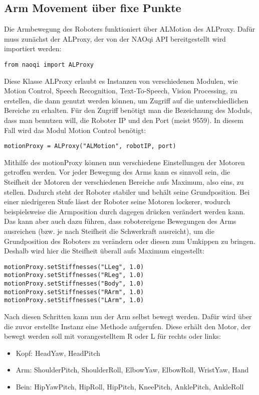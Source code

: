 \subsection{Arm Movement über fixe Punkte}
Die Armbewegung des Roboters funktioniert über ALMotion des ALProxy.
Dafür muss zunächst der ALProxy, der von der NAOqi API bereitgestellt wird importiert werden: 
\begin{verbatim}
from naoqi import ALProxy
\end{verbatim}
Diese Klasse ALProxy erlaubt es Instanzen von verschiedenen Modulen, wie Motion Control, Speech Recognition, Text-To-Speech, Vision Processing, zu erstellen, die dann genutzt werden können, um Zugriff auf die unterschiedlichen Bereiche zu erhalten. Für den Zugriff benötigt man die Bezeichnung des Moduls, dass man benutzen will, die Roboter IP und den Port (meist 9559).
In diesem Fall wird das Modul Motion Control benötigt:
\begin{verbatim}
motionProxy = ALProxy("ALMotion", robotIP, port)
\end{verbatim}
Mithilfe des motionProxy können nun verschiedene Einstellungen der Motoren getroffen werden. Vor jeder Bewegung des Arms kann es sinnvoll sein, die Steifheit der Motoren der verschiedenen Bereiche aufs Maximum, also eins, zu stellen. Dadurch steht der Roboter stabiler und behält seine Grundposition. Bei einer niedrigeren Stufe lässt der Roboter seine Motoren lockerer, wodurch beispielsweise die Armposition durch dagegen drücken verändert werden kann. Das kann aber auch dazu führen, dass robotereigene Bewegungen des Arms ausreichen (bzw. je nach Steifheit die Schwerkraft ausreicht), um die Grundposition des Roboters zu verändern oder diesen zum Umkippen zu bringen.
Deshalb wird hier die Steifheit überall aufs Maximum eingestellt: 
\begin{verbatim}
motionProxy.setStiffnesses("LLeg", 1.0)
motionProxy.setStiffnesses("RLeg", 1.0)
motionProxy.setStiffnesses("Body", 1.0)
motionProxy.setStiffnesses("RArm", 1.0)
motionProxy.setStiffnesses("LArm", 1.0)
\end{verbatim}
Nach diesen Schritten kann nun der Arm selbst bewegt werden. Dafür wird über die zuvor erstellte Instanz eine Methode aufgerufen. Diese erhält den Motor, der bewegt werden soll mit vorangestelltem R oder L für rechts oder links:
\begin{itemize}
    \item Kopf: HeadYaw, HeadPitch
    \item Arm: ShoulderPitch, ShoulderRoll, ElbowYaw, ElbowRoll, WristYaw, Hand
    \item Bein: HipYawPitch, HipRoll, HipPitch, KneePitch, AnklePitch, AnkleRoll
\end{itemize}
